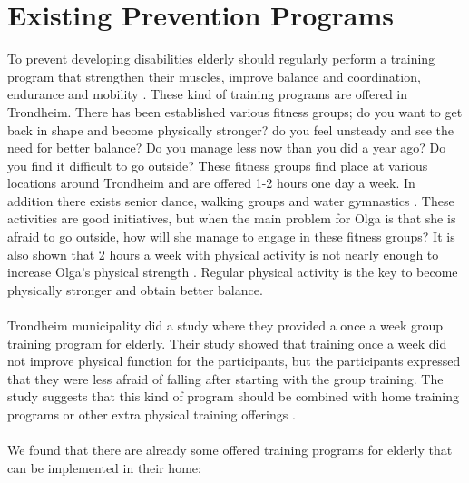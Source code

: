 \section{Existing Prevention Programs}
To prevent developing disabilities elderly should regularly perform a training program that strengthen their muscles, improve balance and coordination, endurance and mobility \cite{gruppetrening-trheim}. These kind of training programs are offered in Trondheim. There has been established various fitness groups; do you want to get back in shape and become physically stronger? do you feel unsteady and see the need for better balance? Do you manage less now than you did a year ago? Do you find it difficult to go outside? These fitness groups find place at various locations around Trondheim and are offered 1-2 hours one day a week. In addition there exists senior dance, walking groups and water gymnastics \cite{trim}. These activities are good initiatives, but when the main problem for Olga is that she is afraid to go outside, how will she manage to engage in these fitness groups? It is also shown that 2 hours a week with physical activity is not nearly enough to increase Olga’s physical strength \cite{gruppetrening-trheim}. Regular physical activity is the key to become physically stronger and obtain better balance. \\ \\
Trondheim municipality did a study where they provided a once a week group training program for elderly. Their study showed that training once a week did not improve physical function for the participants, but the participants expressed that they were less afraid of falling after starting with the group training. The study suggests that this kind of program should be combined with home training programs or other extra physical training offerings \cite{gruppetrening-trheim}. \\ \\
We found that there are already some offered training programs for elderly that can be implemented in their home:\\ \\
